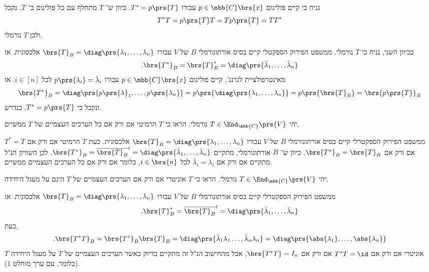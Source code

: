 \documentclass[a4paper,10pt,twoside,openany]{book}
\begin{document}
\begin{solution}
נניח כי קיים פולינום
$p \in \mbb{C}\brs{x}$
עבורו
$T^* = p\prs{T}$.
כיוון ש־%
$T$
מתחלף עם כל פולינום ב־%
$T$,
נקבל
\[T^* T = p\prs{T} T = T p\prs{T} = T T^*\]
ולכן
$T$
נורמלי.

בכיוון השני, נניח כי
$T$
נורמלי.
ממשפט הפירוק הספקטלי קיים בסיס אורתונורמלי
$B$
של
$V$
עבורו
$\brs{T}_B = \diag\prs{\lambda_1, \ldots, \lambda_n}$
אלכסונית.
אז
\[\text{.} \brs{T^*}_B = \brs{T}_B^* = \diag\prs{\bar{\lambda}_1, \ldots, \bar{\lambda}_n}\]
מאינטרפולציית לגרנג', קיים פולינום
$p \in \mbb{C}\brs{x}$
עבורו
$p\prs{\lambda_i} = \bar{\lambda}_i$
לכל
$i \in [n]$.
אז
\[\brs{T^*}_B = \diag\prs{p\prs{\lambda}_1, \ldots, p\prs{\lambda_n}} = p\prs{\diag\prs{\lambda_1, \ldots, \lambda_n}} = p\prs{\brs{T}_B} = \brs{p\prs{T}}_B\]
ונקבל כי
$T^* = p\prs{T}$,
כנדרש.
\end{solution}

\begin{exercisechap}
יהי
$T \in \End_{\mbb{C}}\prs{V}$
נורמלי. הראו כי
$T$
הרמיטי אם ורק אם כל הערכים העצמיים של
$T$
ממשיים.
\end{exercisechap}

\begin{solution}
ממשפט הפירוק הספקטרלי קיים בסיס אורתונורמלי
$B$
של
$V$
עבורו
$\brs{T}_B = \diag\prs{\lambda_1, \ldots, \lambda_n}$
אלכסונית.
כעת
$T$
הרמיטי אם ורק אם
$T^* = T$
אם ורק אם
$\brs{T^*}_B = \brs{T}_B$.
כיוון ש־%
$B$
אורתונורמלי, מתקיים
$\brs{T^*}_B = \overline{\brs{T}_B}^t = \diag\prs{\bar{\lambda}_1, \ldots, \bar{\lambda}_n}$.
לכן השוויון הנ"ל מתקיים אם ורק אם
$\bar{\lambda}_i = \lambda_i$
לכל
$i \in \brs{n}$,
כלומר אם ורק אם כל הערכים העצמיים ממשיים.
\end{solution}

\begin{exercisechap}
יהי
$T \in \End_{\mbb{C}}\prs{V}$
נורמלי. הראו כי
$T$
אוניטרי אם ורק אם
הערכים העצמיים של
$T$
הינם על מעגל היחידה.
\end{exercisechap}

\begin{solution}
ממשפט הפירוק הספקטרלי קיים בסיס אורתונורמלי
$B$
של
$V$
עבורו
$\brs{T}_B = \diag\prs{\lambda_1, \ldots, \lambda_n}$
אלכסונית.
אז
\[\text{.} \brs{T}_B^* = \overline{\brs{T}_B}^t = \diag\prs{\bar{\lambda}_1, \ldots, \bar{\lambda}_n}\]
כעת,
\[\text{.} \brs{T^* T}_B = \brs{T^*}_B \brs{T}_B = \diag\prs{\bar{\lambda}_1 \lambda_1 \ldots, \bar{\lambda}_n \lambda_n} = \diag\prs{\abs{\lambda_1}, \ldots, \abs{\lambda_n}}\]
$T$
אוניטרי אם ורק אם
$T^* T = \id$
אם ורק אם
$\brs{T^* T} = I_n$,
אבל מהחישוב הנ"ל זה מתקיים בדיוק כאשר הערכים העצמיים של
$T$
על מעגל היחידה (כלומר, עם ערך מוחלט
$1$).
\end{solution}
\end{document}
